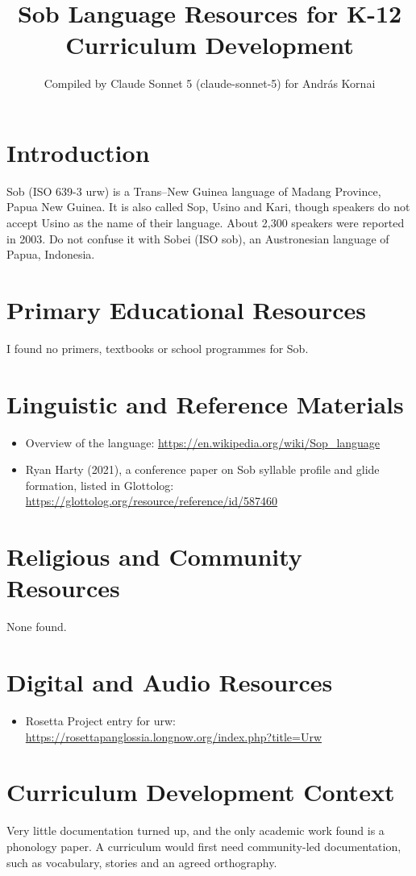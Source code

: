 \documentclass[12pt]{article}
\title{Sob Language Resources for K-12 Curriculum Development}
\author{Compiled by Claude Sonnet 5 (claude-sonnet-5) for Andr\'as Kornai}
\date{}
\begin{document}
\maketitle

\section{Introduction}
Sob (ISO 639-3 urw) is a Trans--New Guinea language of Madang Province, Papua New Guinea. It is also called Sop, Usino and Kari, though speakers do not accept Usino as the name of their language. About 2,300 speakers were reported in 2003. Do not confuse it with Sobei (ISO sob), an Austronesian language of Papua, Indonesia.

\section{Primary Educational Resources}
I found no primers, textbooks or school programmes for Sob.

\section{Linguistic and Reference Materials}
\begin{itemize}
\item Overview of the language: \url{https://en.wikipedia.org/wiki/Sop_language}
\item Ryan Harty (2021), a conference paper on Sob syllable profile and glide formation, listed in Glottolog: \url{https://glottolog.org/resource/reference/id/587460}
\end{itemize}

\section{Religious and Community Resources}
None found.

\section{Digital and Audio Resources}
\begin{itemize}
\item Rosetta Project entry for urw: \url{https://rosettapanglossia.longnow.org/index.php?title=Urw}
\end{itemize}

\section{Curriculum Development Context}
Very little documentation turned up, and the only academic work found is a phonology paper. A curriculum would first need community-led documentation, such as vocabulary, stories and an agreed orthography.
\end{document}
